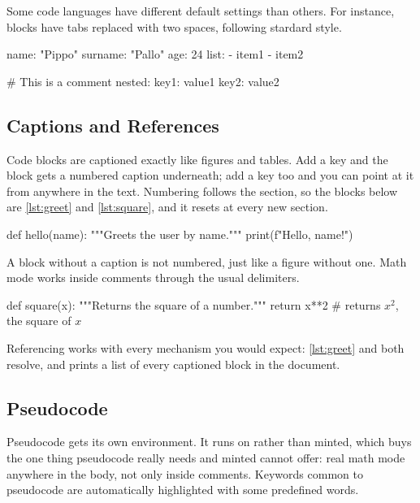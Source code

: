 \documentclass[../main.tex]{subfiles}
\begin{document}
Some code languages have different default settings than others. For instance,  blocks have tabs replaced with two spaces, following stardard  style. 

\begin{yaml}[caption = {A \cc{YAML} code block}]
name: "Pippo"
surname: "Pallo"
age: 24
list:
  - item1
  - item2

# This is a comment
nested:
  key1: value1
  key2: value2
\end{yaml}


\subsection{Captions and References}

Code blocks are captioned exactly like figures and tables. Add a  key and the block gets a numbered caption underneath; add a  key too and you can point at it from anywhere in the text. Numbering follows the section, so the blocks below are \ref{lst:greet} and \ref{lst:square}, and it resets at every new section.

\begin{python}[caption = {A function greeting the user by name}, label = {lst:greet}]
def hello(name):
    """Greets the user by name."""
    print(f"Hello, {name}!")
\end{python}

A block without a caption is not numbered, just like a figure without one. Math mode works inside comments through the usual  delimiters.

\begin{python}[caption = {Squaring a number}, label = {lst:square}]
def square(x):
    """Returns the square of a number."""
    return x**2 # returns $x^2$, the square of $x$
\end{python}

Referencing works with every mechanism you would expect: \cref{lst:greet} and  both resolve, and  prints a list of every captioned block in the document.

\subsection{Pseudocode}

Pseudocode gets its own environment. It runs on  rather than minted, which buys the one thing pseudocode really needs and minted cannot offer: real math mode anywhere in the body, not only inside comments. Keywords common to pseudocode are automatically highlighted with some predefined words.
\end{document}
